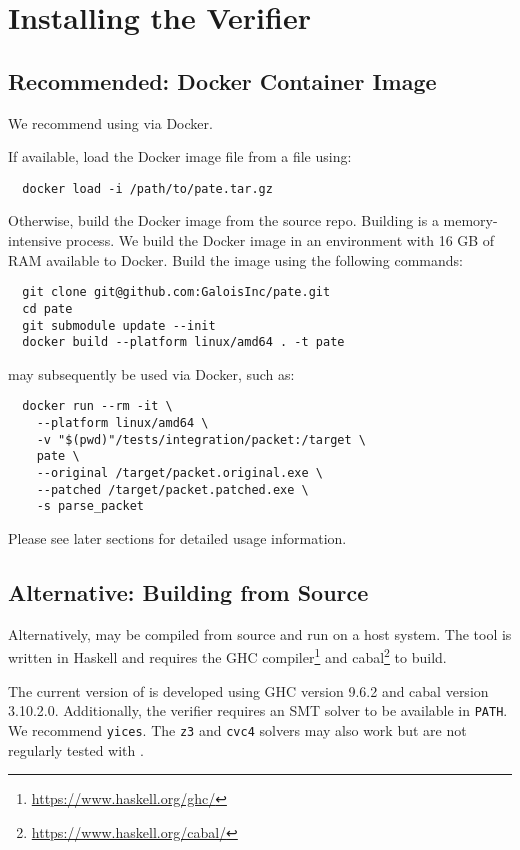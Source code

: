 \section{Installing the \pate{} Verifier}
\label{sec:build-pate-verif}

\subsection{Recommended: Docker Container Image}

We recommend using \pate{} via Docker.

If available, load the Docker image file from a file using:
\begin{verbatim}
  docker load -i /path/to/pate.tar.gz
\end{verbatim}

Otherwise, build the Docker image from the \pate{} source repo.
Building \pate{} is a memory-intensive process.
We build the Docker image in an environment with 16 GB of RAM available to Docker.
Build the image using the following commands:

\begin{verbatim}
  git clone git@github.com:GaloisInc/pate.git
  cd pate
  git submodule update --init
  docker build --platform linux/amd64 . -t pate
\end{verbatim}

\pate{} may subsequently be used via Docker, such as:

\begin{verbatim}
  docker run --rm -it \
    --platform linux/amd64 \
    -v "$(pwd)"/tests/integration/packet:/target \
    pate \
    --original /target/packet.original.exe \
    --patched /target/packet.patched.exe \
    -s parse_packet
\end{verbatim}

Please see later sections for detailed usage information.

\subsection{Alternative: Building from Source}

Alternatively, \pate{} may be compiled from source and run on a host system.
The \pate{} tool is written in Haskell and requires the GHC compiler\footnote{\url{https://www.haskell.org/ghc/}} and cabal\footnote{\url{https://www.haskell.org/cabal/}} to build.

The current version of \pate{} is developed using GHC version 9.6.2 and cabal version 3.10.2.0.
Additionally, the verifier requires an SMT solver to be available in \texttt{PATH}.
We recommend \texttt{yices}.
The \texttt{z3} and \texttt{cvc4} solvers may also work but are not regularly tested with \pate{}.

